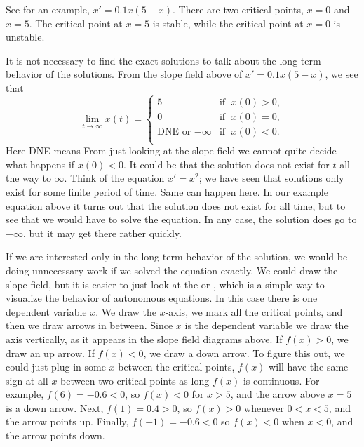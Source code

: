 See  for an example, $x' = 0.1 x(5-x)$.
There are two critical points, $x=0$ and $x=5$.  The critical point
at $x=5$ is stable, while the critical point at $x=0$ is
unstable.

It is not necessary to find the exact solutions to talk about the long
term behavior of the solutions.  From the slope field above of
$x' = 0.1 x(5-x)$, we 
see that
\begin{equation*}
\lim_{t\to \infty} x(t) = 
\begin{cases}
5 & \text{if } \; x(0) > 0 , \\
0 & \text{if } \; x(0) = 0 , \\
\text{DNE or } {-\infty} & \text{if } \; x(0) < 0 . \\
\end{cases}
\end{equation*}
Here DNE means   From just looking at the slope field we
cannot quite decide what happens if $x(0) < 0$.  It could be that the
solution does not exist for $t$ all the way to $\infty$.
Think of the equation $x' = x^2$; we
have seen that solutions only exist for some finite period of time.  Same can happen
here.  In our example equation above it turns out that the
solution does not exist for all time, but to see that we would have to solve
the equation.  In any case, the solution does go to $-\infty$, but it may get
there rather quickly.


If we are interested only in the long term behavior of the solution, 
we would be doing unnecessary work if we solved the
equation exactly.
We could draw the slope field, but
it is easier to just look at the \emph{} or
\emph{}, which is a simple
way to visualize the behavior of
autonomous equations.  In this case there is one dependent variable $x$.
We draw the $x$-axis, we mark all the critical points,
and then we draw arrows in
between.  Since $x$ is the dependent variable we draw the axis vertically,
as it appears in the slope field diagrams above.
If $f(x) > 0$, we draw an up arrow.  If $f(x) < 0$, we draw 
a down arrow.
To figure this out, we could just plug in some $x$ between the critical
points, $f(x)$ will have the same sign at all $x$ between two critical
points as long $f(x)$ is continuous.
For example, $f(6) = -0.6 < 0$, so $f(x) < 0$ for $x > 5$,
and the arrow above $x=5$ is a down
arrow.  Next, $f(1) = 0.4 > 0$, so $f(x) > 0$ whenever $0 < x < 5$, and
the arrow points up.  Finally, $f(-1) = -0.6 < 0$ so $f(x) < 0$ when $x <
0$, and the arrow points down.

